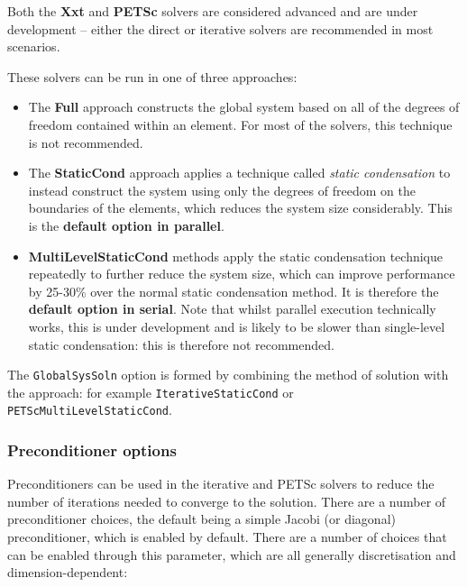 Both the \textbf{Xxt} and \textbf{PETSc} solvers are considered advanced and are
under development -- either the direct or iterative solvers are recommended in
most scenarios.

These solvers can be run in one of three approaches:

\begin{itemize}
  \item The \textbf{Full} approach constructs the global system based on all of
  the degrees of freedom contained within an element. For most of the \nekpp
  solvers, this technique is not recommended.
  \item The \textbf{StaticCond} approach applies a technique called \emph{static
    condensation} to instead construct the system using only the degrees of
  freedom on the boundaries of the elements, which reduces the system size
  considerably. This is the \textbf{default option in parallel}.
  \item \textbf{MultiLevelStaticCond} methods apply the static condensation
  technique repeatedly to further reduce the system size, which can improve
  performance by 25-30\% over the normal static condensation method. It is
  therefore the \textbf{default option in serial}. Note that whilst parallel
  execution technically works, this is under development and is likely to be
  slower than single-level static condensation: this is therefore not
  recommended.
\end{itemize}

The \texttt{GlobalSysSoln} option is formed by combining the method of solution
with the approach: for example \texttt{IterativeStaticCond} or
\texttt{PETScMultiLevelStaticCond}.

\subsubsection{Preconditioner options}

Preconditioners can be used in the iterative and PETSc solvers to reduce the
number of iterations needed to converge to the solution. There are a number of
preconditioner choices, the default being a simple Jacobi (or diagonal)
preconditioner, which is enabled by default. There are a number of choices that
can be enabled through this parameter, which are all generally discretisation
and dimension-dependent:

